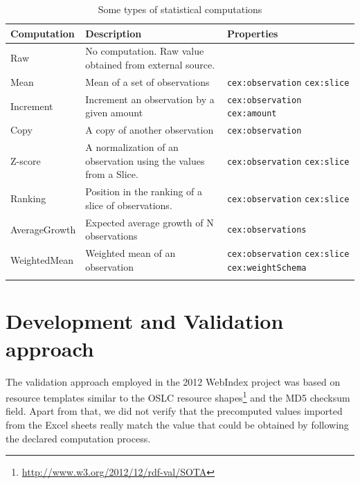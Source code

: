 \documentclass{llncs}
\newcommand{\footnoteUrl}[1]{\footnote{\url{#1}}}
\begin{document}
\begin{table}[t]
\label{table:computations}
\begin{center}
\begin{tabular}{ p{} p{} p{}}
\toprule
Computation & Description & Properties \\
\hline
Raw			& No computation. Raw value obtained from external source.
			&  \\
Mean	    & Mean of a set of observations 
			& \lstinline|cex:observation| \newline 
			  \lstinline|cex:slice| \\
Increment	& Increment an observation by a given amount 
			& \lstinline|cex:observation| \newline 
			  \lstinline|cex:amount|  \\
Copy		& A copy of another observation 
			& \lstinline|cex:observation| \\
Z-score		& A normalization of an observation using the values from a Slice. 
			& \lstinline|cex:observation| \newline 
			  \lstinline|cex:slice| \\
Ranking		& Position in the ranking of a slice of observations. 
			& \lstinline|cex:observation| \newline 
			  \lstinline|cex:slice| \\
AverageGrowth & Expected average growth of N observations
			  & \lstinline|cex:observations| \\
WeightedMean & Weighted mean of an observation
			& \lstinline|cex:observation| \newline
			  \lstinline|cex:slice|       \newline
			  \lstinline|cex:weightSchema| \\
\bottomrule\\
\end{tabular}
\caption{Some types of statistical computations}
\end{center}
\end{table}

\section{Development and Validation approach}

The validation approach employed in the 2012 WebIndex project was based on
 resource templates similar to the OSLC resource
 shapes\footnoteUrl{http://www.w3.org/2012/12/rdf-val/SOTA} and
 the MD5 checksum field. 
 Apart from that, we did not verify that the precomputed values imported from
 the Excel sheets really match the value that could be obtained by 
 following the declared computation process.
\end{document}
